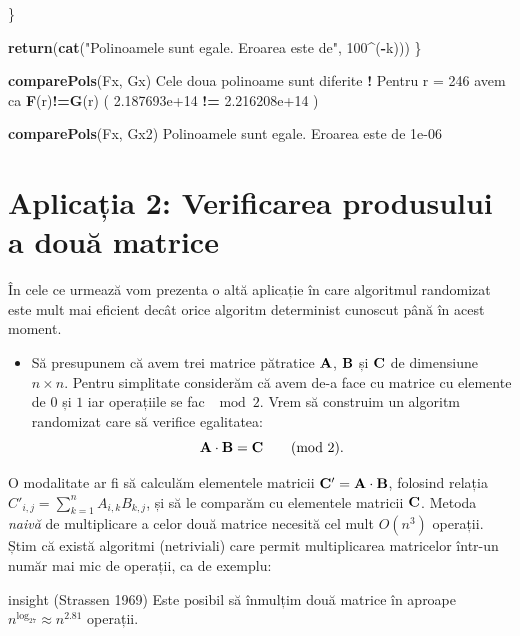 \documentclass[]{article}
\newenvironment{Shaded}{\begin{snugshade}}{\end{snugshade}}
\newcommand{\KeywordTok}[1]{\textcolor[rgb]{0.13,0.29,0.53}{\textbf{#1}}}
\newcommand{\DecValTok}[1]{\textcolor[rgb]{0.00,0.00,0.81}{#1}}
\newcommand{\FloatTok}[1]{\textcolor[rgb]{0.00,0.00,0.81}{#1}}
\newcommand{\StringTok}[1]{\textcolor[rgb]{0.31,0.60,0.02}{#1}}
\newcommand{\OperatorTok}[1]{\textcolor[rgb]{0.81,0.36,0.00}{\textbf{#1}}}
\newcommand{\NormalTok}[1]{#1}
\newenvironment{frshaded*}{%
  \def\FrameCommand{\fboxrule=\FrameRule\fboxsep=\FrameSep \fcolorbox{framecolor}{shadecolor1}}%
  \MakeFramed {\advance\hsize-\width \FrameRestore}}%
{\endMakeFramed}
\newenvironment{rmdblock}[1]
  {\begin{frshaded*}
  \begin{itemize}
  \renewcommand{\labelitemi}{
    \raisebox{-.7\height}[0pt][0pt]{
      {\setkeys{Gin}{width=2em,keepaspectratio}\texttt{[image: images/icons/\#1]}}
    }
  }
  \item
  }
  {
  \end{itemize}
  \end{frshaded*}
  }
\newenvironment{rmdexercise}
  {\begin{rmdblock}{exercise}}
  {\end{rmdblock}}
\newenvironment{frshaded_insight*}{%
  \def\FrameCommand{\fboxrule=\FrameRule\fboxsep=\FrameSep \fcolorbox{framecolor_insight}{shadecolor_insight}}%
  \MakeFramed {\advance\hsize-\width \FrameRestore}}%
{\endMakeFramed}
\newenvironment{rmdblock_insight}[1]
  {\begin{frshaded_insight*}
  \begin{itemize}
  \renewcommand{\labelitemi}{
    \raisebox{-.7\height}[0pt][0pt]{
      {\setkeys{Gin}{width=2em,keepaspectratio}\texttt{[image: images/icons/\#1]}}
    }
  }
  \item
  }
  {
  \end{itemize}
  \end{frshaded_insight*}
  }
\newenvironment{rmdinsight}
  {\begin{rmdblock_insight}{insight}}
  {\end{rmdblock_insight}}
\begin{document}
\begin{Shaded}
\begin{Highlighting}[]
\NormalTok{  \}}
  
  \KeywordTok{return}\NormalTok{(}\KeywordTok{cat}\NormalTok{(}\StringTok{"Polinoamele sunt egale. Eroarea este de"}\NormalTok{, }\DecValTok{100}\OperatorTok{^}\NormalTok{(}\OperatorTok{-}\NormalTok{k)))}
\NormalTok{\}}

\KeywordTok{comparePols}\NormalTok{(Fx, Gx)}
\NormalTok{Cele doua polinoame sunt diferite }\OperatorTok{!}\StringTok{ }
\NormalTok{Pentru r =}\StringTok{ }\DecValTok{246}\NormalTok{ avem ca }\KeywordTok{F}\NormalTok{(r)}\OperatorTok{!=}\KeywordTok{G}\NormalTok{(r) ( }\FloatTok{2.187693e+14} \OperatorTok{!=}\StringTok{ }\FloatTok{2.216208e+14}\NormalTok{ )}

\KeywordTok{comparePols}\NormalTok{(Fx, Gx2)}
\NormalTok{Polinoamele sunt egale. Eroarea este de }\FloatTok{1e-06}
\end{Highlighting}
\end{Shaded}

\section{Aplicația 2: Verificarea produsului a două
matrice}\label{aplicatia-2-verificarea-produsului-a-doua-matrice}

În cele ce urmează vom prezenta o altă aplicație în care algoritmul
randomizat este mult mai eficient decât orice algoritm determinist
cunoscut până în acest moment.

\begin{rmdexercise}
Să presupunem că avem trei matrice pătratice \(\bf{A}\), \(\bf{B}\) și
\(\bf{C}\) de dimensiune \(n \times n\). Pentru simplitate considerăm că
avem de-a face cu matrice cu elemente de \(0\) și \(1\) iar operațiile
se fac \(\mod2\). Vrem să construim un algoritm randomizat care să
verifice egalitatea: \[
  \bf{A}\cdot\bf{B}=\bf{C} \qquad (\text{mod 2}).
\]
\end{rmdexercise}

O modalitate ar fi să calculăm elementele matricii
\(\bf{C}'=\bf{A}\cdot\bf{B}\), folosind relația
\(C'_{i,j} = \sum_{k=1}^{n}A_{i,k}B_{k,j}\), și să le comparăm cu
elementele matricii \(\bf{C}\). Metoda \emph{naivă} de multiplicare a
celor două matrice necesită cel mult \(O(n^3)\) operații. Știm că există
algoritmi (netriviali) care permit multiplicarea matricelor într-un
număr mai mic de operații, ca de exemplu:

\begin{rmdinsight}
(Strassen 1969) Este posibil să înmulțim două matrice în aproape
\(n^{\log_27}\approx n^{2.81}\) operații.
\end{rmdinsight}
\end{document}
